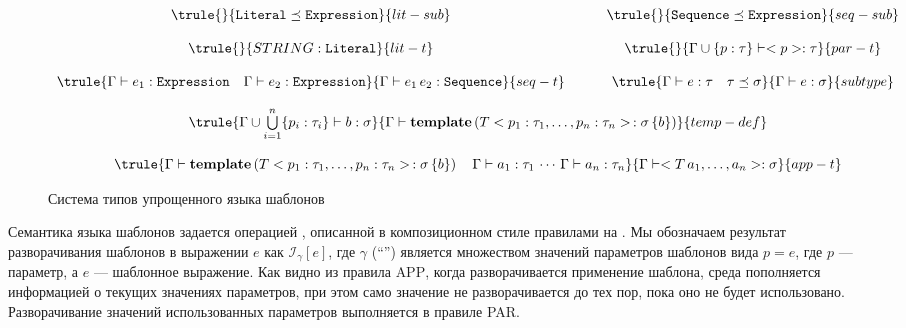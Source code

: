 \begin{figure}[htbp]
$$
\begin{array}{ccc}
\trule{}{\mathtt{Literal} \preceq \mathtt{Expression}}{lit-sub}
&&
\trule{}{\mathtt{Sequence} \preceq \mathtt{Expression}}{seq-sub}
\\
&&\,\\
\trule{}{STRING : \mathtt{Literal}}{lit-t}
&\quad&
\trule{}{\Gamma \cup \{p : \tau\} \vdash <p> : \tau}{par-t}
\\
&&\,\\
%
\trule{
	\Gamma \vdash e_1 : \mathtt{Expression} 
	\quad 
	\Gamma \vdash e_2 : \mathtt{Expression}
}{
	\Gamma \vdash e_1 \, e_2 : \mathtt{Sequence}
}{seq-t}
&&
\trule{
	\Gamma \vdash e : \tau
	\quad 
	\tau \preceq \sigma 
}{
	\Gamma \vdash e : \sigma
}{subtype}
\\
&&\,\\
\multicolumn{3}{c}{
\trule{
	\Gamma \cup \bigcup\limits_{i=1}^{n} \{ p_i : \tau_i \} \vdash b : \sigma
}{
	\Gamma \vdash \mathbf{template}\left(
		T <p_1 : \tau_1, \ldots, p_n : \tau_n> \,: \sigma \, \{ b \}
	\right)
}{temp-def}
}
\\
&&\,\\
\multicolumn{3}{c}{
\trule{
	\Gamma \vdash \mathbf{template}\left(
		T <p_1 : \tau_1, \ldots, p_n : \tau_n> \,: \sigma \, \{ b \}
	\right)
	\quad
	\Gamma \vdash a_1 : \tau_1 \, \cdots \, \Gamma \vdash a_n : \tau_n
}{
	\Gamma \vdash <T \, a_1, \ldots, a_n> : \sigma
}{app-t}
}
\end{array}
$$
	\caption{Система типов упрощенного языка шаблонов}\label{TempTypes}
\end{figure}

\newcommand{\Inst}[2]{\mathcal{I}_{#1} \left[ #2 \right]}%
Семантика языка шаблонов задается операцией , описанной в композиционном стиле правилами на . Мы обозначаем результат разворачивания шаблонов в выражении $e$ как $\Inst{\gamma}{e}$, где $\gamma$ (``'') является множеством значений параметров шаблонов вида $p = e$, где $p$ --- параметр, а $e$ --- шаблонное выражение. Как видно из правила \textsc{APP}, когда разворачивается применение шаблона, среда пополняется информацией о текущих значениях параметров, при этом само значение не разворачивается до тех пор, пока оно не будет использовано. Разворачивание значений использованных параметров выполняется в правиле \textsc{PAR}.

